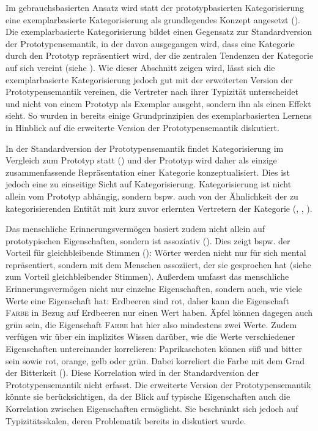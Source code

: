Im gebrauchsbasierten Ansatz wird statt der prototypbasierten Kategorisierung eine exemplarbasierte Kategorisierung als grundlegendes Konzept angesetzt (\cite[68]{Bybee.2013}). Die exemplarbasierte Kategorisierung bildet einen Gegensatz zur Standardversion der Prototypensemantik, in der davon ausgegangen wird, dass eine Kategorie durch den Prototyp repräsentiert wird, der die zentralen Tendenzen der Kategorie auf sich vereint (siehe ). Wie dieser Abschnitt zeigen wird, lässt sich die exemplarbasierte Kategorisierung jedoch gut mit der erweiterten Version der Prototypensemantik vereinen, die Vertreter nach ihrer Typizität unterscheidet und nicht von einem Prototyp als Exemplar ausgeht, sondern ihn als einen Effekt sieht. So wurden in  bereits einige Grundprinzipien des exemplarbasierten Lernens in Hinblick auf die erweiterte Version der Prototypensemantik diskutiert.

In der Standardversion der Prototypensemantik findet Kategorisierung im Vergleich zum Prototyp statt (\cite[208]{Ross.1999}) und der Prototyp wird daher als einzige zusammenfassende Repräsentation einer Kategorie konzeptualisiert. Dies ist jedoch eine zu einseitige Sicht auf Kategorisierung. Kategorisierung ist nicht allein vom Prototyp abhängig, sondern bspw. auch von der Ähnlichkeit der zu kategorisierenden Entität mit kurz zuvor erlernten Vertretern der Kategorie (\cite{Whittlesea.1987}, \cite[208]{Ross.1999}, \cite[46]{Goldberg.2006}).

 Das menschliche Erinnerungsvermögen basiert zudem nicht allein auf prototypischen Eigenschaften, sondern ist assoziativ (\cite[52]{Goldberg.2019}). Dies zeigt bspw. der Vorteil für gleichbleibende Stimmen (\cite[255]{Goldinger.1998}): Wörter werden nicht nur für sich mental repräsentiert, sondern mit dem Menschen assoziiert, der sie gesprochen hat (siehe  zum Vorteil gleichbleibender Stimmen). Außerdem umfasst das menschliche Erinnerungsvermögen nicht nur einzelne Eigenschaften, sondern auch, wie viele Werte eine Eigenschaft hat: Erdbeeren sind rot, daher kann die Eigenschaft \textsc{Farbe} in Bezug auf Erdbeeren nur einen Wert haben. Äpfel können dagegen auch grün sein, die Eigenschaft \textsc{Farbe} hat hier also mindestens zwei Werte. Zudem verfügen wir über ein implizites Wissen darüber, wie die Werte verschiedener Eigenschaften untereinander korrelieren: Paprikaschoten können süß und bitter sein sowie rot, orange, gelb oder grün. Dabei korreliert die Farbe mit dem Grad der Bitterkeit (\cite[211--212]{Ross.1999}). Diese Korrelation wird in der Standardversion der Prototypensemantik nicht erfasst. Die erweiterte Version der Prototypensemantik könnte sie berücksichtigen, da der Blick auf typische Eigenschaften auch die Korrelation zwischen Eigenschaften ermöglicht. Sie beschränkt sich jedoch auf Typizitäts\-skalen, deren Problematik bereits in  diskutiert wurde.

